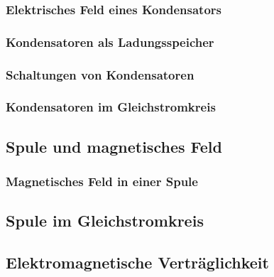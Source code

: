 \subsubsection{Elektrisches Feld eines Kondensators}
\subsubsection{Kondensatoren als Ladungsspeicher}
\subsubsection{Schaltungen von Kondensatoren}
\subsubsection{Kondensatoren im Gleichstromkreis}

\subsection{Spule und magnetisches Feld}
\subsubsection{Magnetisches Feld in einer Spule}
\subsection{Spule im Gleichstromkreis}

\subsection{Elektromagnetische Verträglichkeit}

